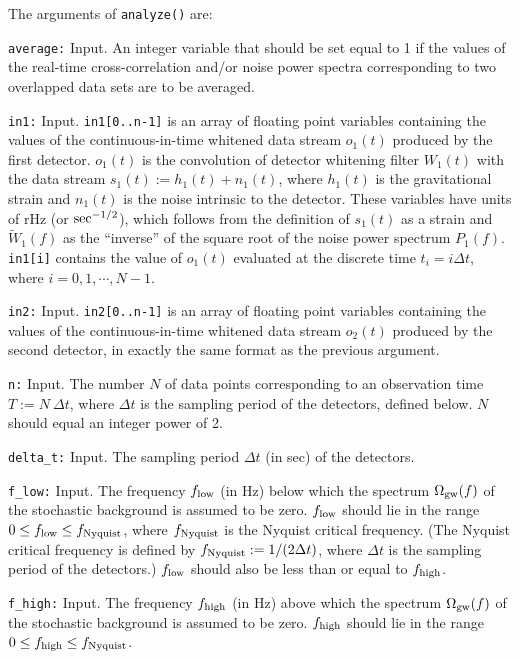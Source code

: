 The arguments of {\tt analyze()} are:
\begin{description}
%
\item{\tt average:} Input.
An integer variable that should be set equal to 1 if the values of the 
real-time cross-correlation and/or noise power spectra corresponding to 
two overlapped data sets are to be averaged.
%
\item{\tt in1:} Input.  
{\tt in1[0..n-1]} is an array of floating point variables containing
the values of the continuous-in-time 
whitened data stream $o_1(t)$ produced by the first detector.
$o_1(t)$ is the convolution of detector whitening filter $W_1(t)$
with the data stream $s_1(t):=h_1(t)+n_1(t)$, where $h_1(t)$ is the 
gravitational strain and $n_1(t)$ is the noise intrinsic to the detector.
These variables have units of rHz (or ${\rm sec}^{-1/2}$),
which follows from the definition of $s_1(t)$ as a strain and
$\tilde W_1(f)$ as the ``inverse'' of the square root of the noise power 
spectrum $P_1(f)$.
{\tt in1[i]} contains the value of $o_1(t)$ evaluated at the discrete 
time $t_i=i\Delta t$, where $i=0,1,\cdots,N-1$.
%
\item{\tt in2:} Input.  
{\tt in2[0..n-1]} is an array of floating point variables containing
the values of the continuous-in-time 
whitened data stream $o_2(t)$ produced by the second detector,
in exactly the same format as the previous argument.
%
\item{\tt n:} Input. 
The number $N$ of data points corresponding to an observation
time $T:=N\ \Delta t$, where
$\Delta t$ is the sampling period of the detectors, defined below.
$N$ should equal an integer power of 2.
%
\item{\tt delta\_t:} Input.  
The sampling period $\Delta t$ (in sec) of the detectors. 
%
\item{\tt f\_low:} Input.  
The frequency $f_{\rm low}$ (in Hz) below which the spectrum 
$\Omega_{\rm gw}(f)$ of the stochastic background is assumed to be zero.
$f_{\rm low}$ should lie in the range $0\le f_{\rm low}\le f_{\rm Nyquist}$, 
where $f_{\rm Nyquist}$ is the Nyquist critical frequency. 
(The Nyquist critical frequency is defined by 
$f_{\rm Nyquist}:=1/(2\Delta t)$, 
where $\Delta t$ is the sampling period of the detectors.)
$f_{\rm low}$ should also be less than or equal to $f_{\rm high}$.
%
\item{\tt f\_high:} Input.  
The frequency $f_{\rm high}$ (in Hz) above which the spectrum 
$\Omega_{\rm gw}(f)$ of the stochastic background is assumed to be zero.
$f_{\rm high}$ should lie in the range $0\le f_{\rm high}\le f_{\rm Nyquist}$.

\end{description}
